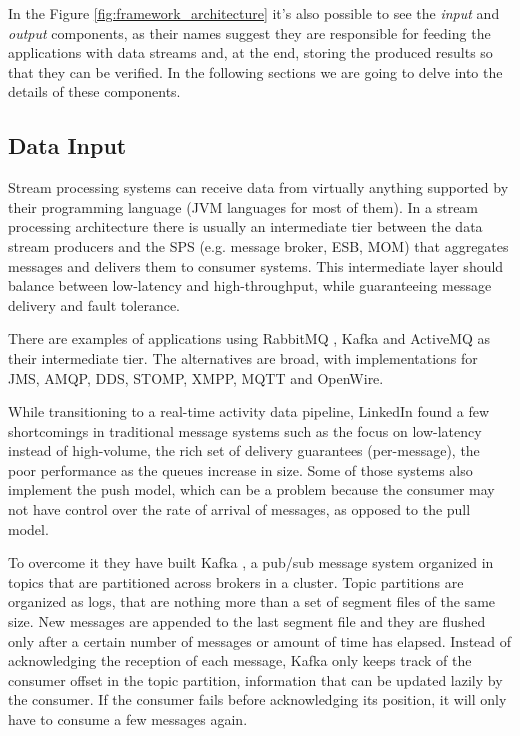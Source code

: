 \documentclass[ppgc,diss,english]{iiufrgs}
\begin{document}
In the Figure \ref{fig:framework_architecture} it's also possible to see the \textit{input} and \textit{output} components, as their names suggest they are responsible for feeding the applications with data streams and, at the end, storing the produced results so that they can be verified. In the following sections we are going to delve into the details of these components.

\subsection{Data Input}

Stream processing systems can receive data from virtually anything supported by their programming language (JVM languages for most of them). In a stream processing architecture there is usually \cite{chardonnens2013big, lim2013execution, wang2013cluster, sawant2013big} an intermediate tier between the data stream producers and the SPS (e.g. message broker, ESB, MOM) that aggregates messages and delivers them to consumer systems. This intermediate layer should balance between low-latency and high-throughput, while guaranteeing message delivery and fault tolerance.

There are examples of applications using RabbitMQ \cite{yang2013big, bumgardner2014scalable}, Kafka \cite{chardonnens2013big, lim2013execution, wang2013cluster} and ActiveMQ \cite{appel2012eventlets, krawczyk2011basic} as their intermediate tier. The alternatives are broad, with implementations for JMS, AMQP, DDS, STOMP, XMPP, MQTT and OpenWire.

While transitioning to a real-time activity data pipeline, LinkedIn \cite{goodhope2012building} found a few shortcomings in traditional message systems such as the focus on low-latency instead of high-volume, the rich set of delivery guarantees (per-message), the poor performance as the queues increase in size. Some of those systems also implement the push model, which can be a problem because the consumer may not have control over the rate of arrival of messages, as opposed to the pull model.

To overcome it they have built Kafka \cite{kreps2011kafka}, a pub/sub message system organized in topics that are partitioned across brokers in a cluster. Topic partitions are organized as logs, that are nothing more than a set of segment files of the same size. New messages are appended to the last segment file and they are flushed only after a certain number of messages or amount of time has elapsed. Instead of acknowledging the reception of each message, Kafka only keeps track of the consumer offset in the topic partition, information that can be updated lazily by the consumer. If the consumer fails before acknowledging its position, it will only have to consume a few messages again.
\end{document}
